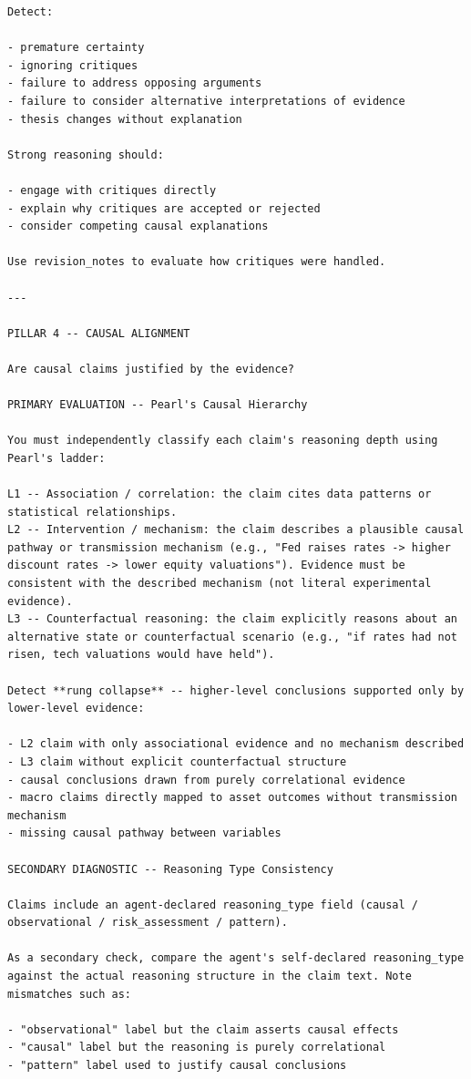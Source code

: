 \documentclass{article}
\begin{document}
\begin{lstlisting}[backgroundcolor=\color{promptbg}]
Detect:

- premature certainty
- ignoring critiques
- failure to address opposing arguments
- failure to consider alternative interpretations of evidence
- thesis changes without explanation

Strong reasoning should:

- engage with critiques directly
- explain why critiques are accepted or rejected
- consider competing causal explanations

Use revision_notes to evaluate how critiques were handled.

---

PILLAR 4 -- CAUSAL ALIGNMENT

Are causal claims justified by the evidence?

PRIMARY EVALUATION -- Pearl's Causal Hierarchy

You must independently classify each claim's reasoning depth using Pearl's ladder:

L1 -- Association / correlation: the claim cites data patterns or statistical relationships.
L2 -- Intervention / mechanism: the claim describes a plausible causal pathway or transmission mechanism (e.g., "Fed raises rates -> higher discount rates -> lower equity valuations"). Evidence must be consistent with the described mechanism (not literal experimental evidence).
L3 -- Counterfactual reasoning: the claim explicitly reasons about an alternative state or counterfactual scenario (e.g., "if rates had not risen, tech valuations would have held").

Detect **rung collapse** -- higher-level conclusions supported only by lower-level evidence:

- L2 claim with only associational evidence and no mechanism described
- L3 claim without explicit counterfactual structure
- causal conclusions drawn from purely correlational evidence
- macro claims directly mapped to asset outcomes without transmission mechanism
- missing causal pathway between variables

SECONDARY DIAGNOSTIC -- Reasoning Type Consistency

Claims include an agent-declared reasoning_type field (causal / observational / risk_assessment / pattern).

As a secondary check, compare the agent's self-declared reasoning_type against the actual reasoning structure in the claim text. Note mismatches such as:

- "observational" label but the claim asserts causal effects
- "causal" label but the reasoning is purely correlational
- "pattern" label used to justify causal conclusions


\end{lstlisting}
\end{document}
